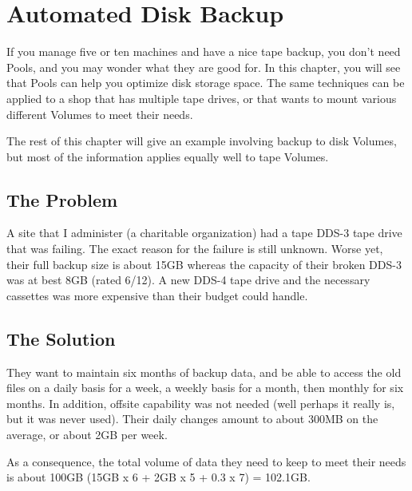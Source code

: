 
\chapter{Automated Disk Backup}
\label{PoolsChapter}


If you manage five or ten machines and have a nice tape backup, you don't need
Pools, and you may wonder what they are good for. In this chapter, you will
see that Pools can help you optimize disk storage space. The same techniques
can be applied to a shop that has multiple tape drives, or that wants to mount
various different Volumes to meet their needs.

The rest of this chapter will give an example involving backup to disk
Volumes, but most of the information applies equally well to tape Volumes.

\label{TheProblem}
\section{The Problem}


A site that I administer (a charitable organization) had a tape DDS-3 tape
drive that was failing. The exact reason for the failure is still unknown.
Worse yet, their full backup size is about 15GB whereas the capacity of their
broken DDS-3 was at best 8GB (rated 6/12). A new DDS-4 tape drive and the
necessary cassettes was more expensive than their budget could handle.

\label{TheSolution}
\section{The Solution}

They want to maintain six months of backup data, and be able to access the old
files on a daily basis for a week, a weekly basis for a month, then monthly
for six months. In addition, offsite capability was not needed (well perhaps
it really is, but it was never used). Their daily changes amount to about
300MB on the average, or about 2GB per week.

As a consequence, the total volume of data they need to keep to meet their
needs is about 100GB (15GB x 6 + 2GB x 5 + 0.3 x 7) = 102.1GB.


